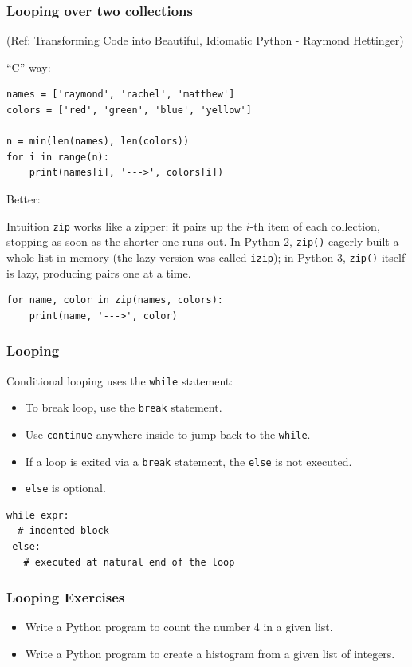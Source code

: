 \begin{frame}[fragile]\frametitle{Looping over two collections}
\tiny{(Ref: Transforming Code into Beautiful, Idiomatic Python -  Raymond Hettinger)}

``C'' way:
\begin{lstlisting}
names = ['raymond', 'rachel', 'matthew']
colors = ['red', 'green', 'blue', 'yellow']

n = min(len(names), len(colors))
for i in range(n):
    print(names[i], '--->', colors[i])
\end{lstlisting}
Better:
\begin{block}{Intuition}
\texttt{zip} works like a zipper: it pairs up the $i$-th item of each collection, stopping as soon as the shorter one runs out. In Python 2, \texttt{zip()} eagerly built a whole list in memory (the lazy version was called \texttt{izip}); in Python 3, \texttt{zip()} itself is lazy, producing pairs one at a time.
\end{block}
\begin{lstlisting}
for name, color in zip(names, colors):
    print(name, '--->', color)
\end{lstlisting}
\end{frame}


\begin{frame}[fragile]\frametitle{Looping}
  Conditional looping uses the \lstinline{while} statement:
  \begin{itemize}
  \item To break loop, use the \lstinline{break} statement.
  \item Use \lstinline{continue} anywhere inside to jump back to the \lstinline{while}.
  \item If a loop is exited via a \lstinline{break} statement, the \lstinline{else} is not executed.
  \item \lstinline{else} is optional.
  \end{itemize}
\begin{lstlisting}
while expr:
  # indented block
 else:
   # executed at natural end of the loop
\end{lstlisting}
\end{frame}


\begin{frame}[fragile]\frametitle{Looping Exercises}
\begin{itemize}
\item Write a Python program to count the number 4 in a given list. 
\item Write a Python program to create a histogram from a given list of integers.
\end{itemize}
\end{frame}




